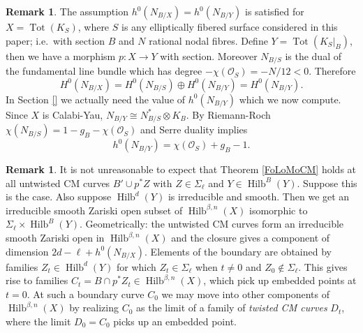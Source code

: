 \documentclass{amsart}
\theoremstyle{definition}
\newtheorem{remark}[theorem]{Remark}
\renewcommand{\O}{\mathcal{O}}
\newcommand{\Hilb}{\operatorname{Hilb}}
\newcommand{\Tot}{\operatorname{Tot}}
\begin{document}
\begin{remark}
The assumption $h^0(N_{B/X}) = h^0(N_{B/Y})$ is satisfied for $X = \Tot(K_S)$, where $S$ is any elliptically fibered surface considered in this paper; i.e.~with section $B$ and $N$ rational nodal fibres. Define $Y = \Tot(K_S|_B)$, then we have a morphism $p : X \rightarrow Y$ with section. Moreover $N_{B/S}$ is the dual of the fundamental line bundle which has degree $-\chi(\O_S) = - N/12 < 0$. Therefore 
\[
H^0(N_{B/X}) = H^0(N_{B/S}) \oplus H^0(N_{B/Y}) = H^0(N_{B/Y}).
\]
In Section \ref{} we actually need the value of $h^0(N_{B/Y})$ which we now compute. Since $X$ is Calabi-Yau, $N_{B/Y} \cong N_{B/S}^* \otimes K_B$. By Riemann-Roch $\chi(N_{B/S}) = 1-g_B - \chi(\O_S)$ and Serre duality implies 
\[
h^0(N_{B/Y}) = \chi(\O_S) + g_B - 1.
\]
\end{remark}
 
\begin{remark}
It is not unreasonable to expect that Theorem \ref{FoLoMoCM} holds at all untwisted CM curves $B' \cup p^*Z$ with $Z \in \Sigma_\ell$ and $Y \in \Hilb^B(Y)$. Suppose this is the case. Also suppose $\Hilb^d(Y)$ is irreducible and smooth. Then we get an irreducible smooth Zariski open subset of $\Hilb^{\beta,n}(X)$ isomorphic to $\Sigma_\ell \times \Hilb^B(Y)$. Geometrically: the untwisted CM curves form an irreducible smooth Zariski open in $\Hilb^{\beta,n}(X)$ and the closure gives a component of dimension $2d - \ell + h^0(N_{B/X})$. Elements of the boundary are obtained by families $Z_t \in \Hilb^d(Y)$ for which $Z_t \in \Sigma_\ell$ when $t \neq 0$ and $Z_0 \notin \Sigma_\ell$. This gives rise to families $C_t = B \cap p^* Z_t \in \Hilb^{\beta,n}(X)$, which pick up embedded points at $t = 0$. At such a boundary curve $C_0$ we may move into other components of $\Hilb^{\beta,n}(X)$ by realizing $C_0$ as the limit of a family of \emph{twisted CM curves} $D_t$, where the limit $D_0 = C_0$ picks up an embedded point. 
\end{remark}
\end{document}

